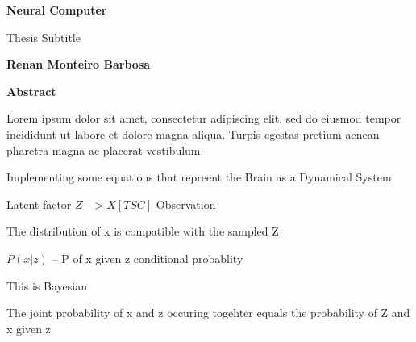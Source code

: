 \documentclass{amsart}
\begin{document}



\thispagestyle{plain}
\begin{center}
    \Large
    \textbf{Neural Computer}
        
    \vspace{0.4cm}
    \large
    Thesis Subtitle
        
    \vspace{0.4cm}
    \textbf{Renan Monteiro Barbosa}
       
    \vspace{0.9cm}
    \textbf{Abstract}
    
    Lorem ipsum dolor sit amet, consectetur adipiscing elit, sed do eiusmod tempor incididunt ut labore et dolore magna aliqua. 
    Turpis egestas pretium aenean pharetra magna ac placerat vestibulum. 

\end{center}


\clearpage



Implementing some equations that repreent the Brain as a Dynamical System:

Latent factor $Z -> X [T S C]$ Observation

The distribution of x is compatible with the sampled Z

$P(x|z)$  -- P of x given z conditional probablity

This is Bayesian

The joint probability of x and z occuring togehter equals the probability of Z and x given z
\end{document}
